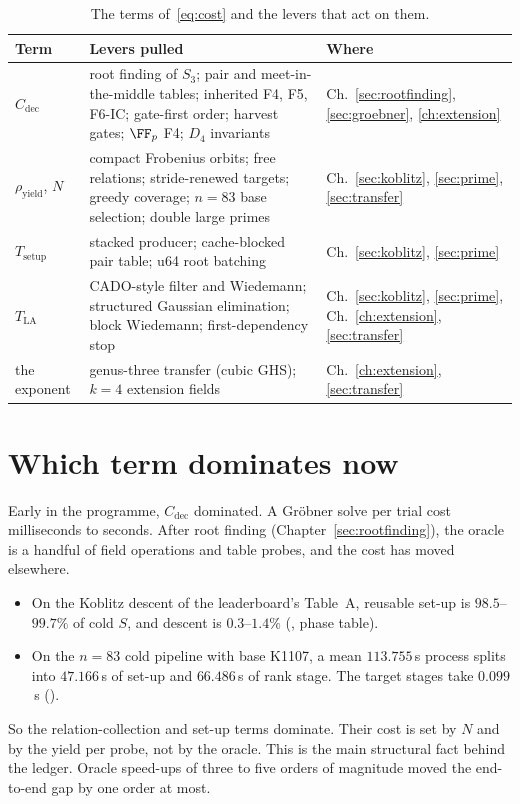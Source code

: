 \begin{table}[t]
\centering\small
\begin{tabularx}{\linewidth}{@{}l>{\raggedright}X>{\raggedright\arraybackslash}p{3.0cm}@{}}
\toprule
Term & Levers pulled & Where \\
\midrule
$C_{\mathrm{dec}}$ & root finding of $S_3$; pair and meet-in-the-middle
  tables; inherited F4, F5, F6-IC; gate-first order; harvest gates;
  $\FF_p$ F4; $D_4$ invariants & Ch.~\ref{sec:rootfinding}, \ref{sec:groebner}, \ref{ch:extension} \\
$\rho_{\mathrm{yield}}$, $N$ & compact Frobenius orbits; free relations;
  stride-renewed targets; greedy coverage; $n=83$ base selection; double
  large primes & Ch.~\ref{sec:koblitz}, \ref{sec:prime}, \ref{sec:transfer} \\
$T_{\mathrm{setup}}$ & stacked producer; cache-blocked pair table; u64 root
  batching & Ch.~\ref{sec:koblitz}, \ref{sec:prime} \\
$T_{\mathrm{LA}}$ & CADO-style filter and Wiedemann; structured Gaussian
  elimination; block Wiedemann; first-dependency stop & Ch.~\ref{sec:koblitz}, \ref{sec:prime},
  Ch.~\ref{ch:extension}, \ref{sec:transfer} \\
the exponent & genus-three transfer (cubic GHS); $k=4$ extension fields &
  Ch.~\ref{ch:extension}, \ref{sec:transfer} \\
\bottomrule
\end{tabularx}
\caption[]{The terms of~\eqref{eq:cost} and the levers that act on them.}
\label{tab:levers}
\end{table}

\section{Which term dominates now}

Early in the programme, $C_{\mathrm{dec}}$ dominated. A Gr\"obner solve per
trial cost milliseconds to seconds. After root finding
(Chapter~\ref{sec:rootfinding}), the oracle is a handful of field operations and table
probes, and the cost has moved elsewhere.
\begin{itemize}
\item On the Koblitz descent of the leaderboard's Table~A, reusable set-up
  is $98.5$--$99.7\%$ of cold $S$, and descent is $0.3$--$1.4\%$
  (, phase table).
\item On the $n=83$ cold pipeline with base K1107, a mean $113.755$\,s
  process splits into $47.166$\,s of set-up and $66.486$\,s of rank stage.
  The target stages take $0.099$\,s
  ().
\end{itemize}
So the relation-collection and set-up terms dominate. Their cost is set by
$N$ and by the yield per probe, not by the oracle. This is the main
structural fact behind the ledger. Oracle speed-ups of three to five orders
of magnitude moved the end-to-end gap by one order at most.
